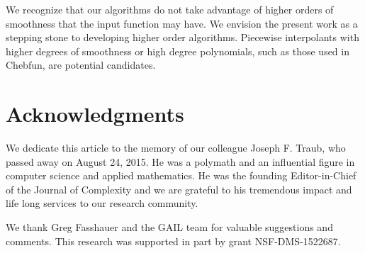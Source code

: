 \documentclass[review]{elsarticle}
\theoremstyle{definition}
\begin{document}
We recognize that our algorithms do not take advantage of higher orders of
smoothness that the input function may have. We envision the present work as a
stepping stone to developing higher order algorithms. Piecewise interpolants
with higher degrees of smoothness or high degree polynomials, such as those used
in Chebfun, are potential candidates.


\section*{Acknowledgments}

We dedicate this article to the memory of our colleague Joseph F. Traub, who
passed away on August 24, 2015. He was a polymath and an influential figure in
computer science and applied mathematics. He was the founding Editor-in-Chief of
the Journal of Complexity and we are grateful to his tremendous impact and life
long services to our research community.

We thank Greg Fasshauer and the GAIL team for
valuable suggestions and comments. This research was supported in part by grant
NSF-DMS-1522687.





\end{document}

